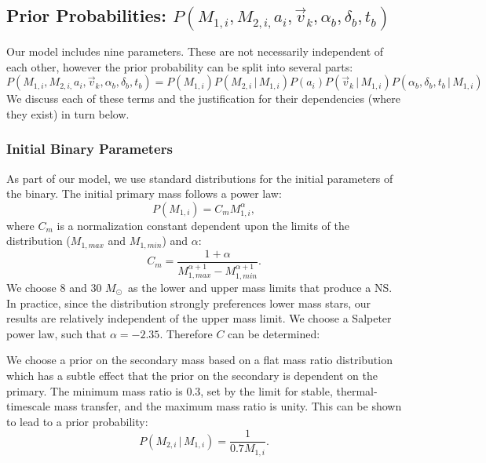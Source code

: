 \documentclass[12pt, preprint]{aastex}
\newcommand{\given}{\,|\,}
\newcommand{\Msun}{\ifmmode {M_{\odot}}\else${M_{\odot}}$\fi}
\begin{document}
\subsection{Prior Probabilities: $P(M_{1,i}, M_{2,i,} a_i, \vec{v}_k, \alpha_b, \delta_b, t_b)$} \label{sec:priors}


Our model includes nine parameters. These are not necessarily independent of each other, however the prior probability can be split into several parts:
\begin{equation}
P(M_{1,i}, M_{2,i,} a_i, \vec{v}_k, \alpha_b, \delta_b, t_b) = P(M_{1,i}) P(M_{2,i} \given M_{1,i}) P(a_i) P(\vec{v}_k \given M_{1,i}) P(\alpha_b, \delta_b, t_b \given M_{1,i})
\end{equation}
We discuss each of these terms and the justification for their dependencies (where they exist) in turn below.

\subsubsection{Initial Binary Parameters}

As part of our model, we use standard distributions for the initial parameters of the binary. The initial primary mass follows a power law:
\begin{equation}
P(M_{1,i}) = C_m M_{1,i}^{\alpha},
\end{equation}
where $C_m$ is a normalization constant dependent upon the limits of the distribution ($M_{1,max}$ and $M_{1,min}$) and $\alpha$:
\begin{equation}
C_m = \frac{1 + \alpha}{M_{1,max}^{\alpha+1} - M_{1,min}^{\alpha+1}}.
\end{equation}
We choose 8 and 30 \Msun\ as the lower and upper mass limits that produce a NS. In practice, since the distribution strongly preferences lower mass stars, our results are relatively independent of the upper mass limit. We choose a Salpeter power law, such that $\alpha = -2.35$. Therefore $C$ can be determined:

We choose a prior on the secondary mass based on a flat mass ratio distribution which has a subtle effect that the prior on the secondary is dependent on the primary. The minimum mass ratio is 0.3, set by the limit for stable, thermal-timescale mass transfer, and the maximum mass ratio is unity. This can be shown to lead to a prior probability:
\begin{equation}
P(M_{2,i} \given M_{1,i}) = \frac{1}{0.7 M_{1,i}}.
\end{equation}
\end{document}
